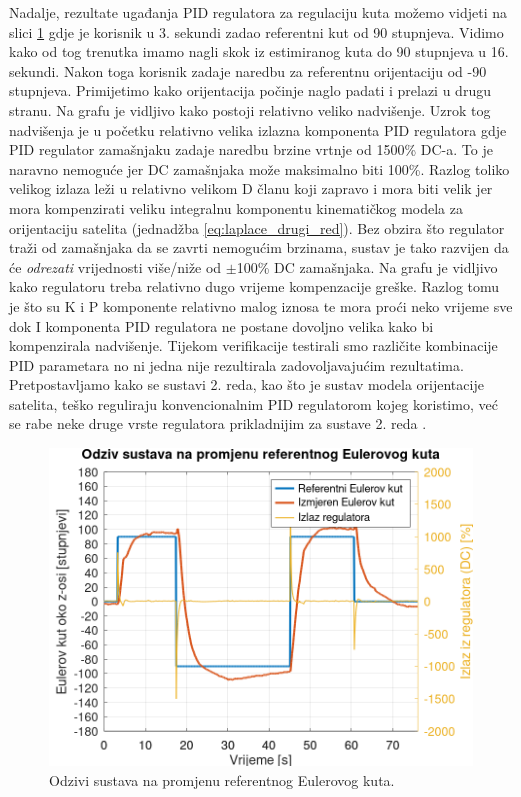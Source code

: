 \documentclass[times, utf8, diplomski, numeric]{templates/template}
\begin{document}
{{        Nadalje, rezultate ugađanja PID regulatora za regulaciju kuta možemo vidjeti na slici \ref{fig:angle_reg_user} gdje je korisnik u 3. sekundi zadao referentni kut od 90 stupnjeva. Vidimo kako od tog trenutka imamo nagli skok iz estimiranog kuta do 90 stupnjeva u 16. sekundi. Nakon toga korisnik zadaje naredbu za referentnu orijentaciju od -90 stupnjeva. Primijetimo kako orijentacija počinje naglo padati i prelazi u drugu stranu. Na grafu je vidljivo kako postoji relativno veliko nadvišenje. Uzrok tog nadvišenja je u početku relativno velika izlazna komponenta PID regulatora gdje PID regulator zamašnjaku zadaje naredbu brzine vrtnje od 1500\% DC-a. To je naravno nemoguće jer DC zamašnjaka može maksimalno biti 100\%. Razlog toliko velikog izlaza leži u relativno velikom D članu koji zapravo i mora biti velik jer mora kompenzirati veliku integralnu komponentu kinematičkog modela za orijentaciju satelita (jednadžba \ref{eq:laplace_drugi_red}). Bez obzira što regulator traži od zamašnjaka da se zavrti nemogućim brzinama, sustav je tako razvijen da će \emph{odrezati}  vrijednosti više/niže od $\pm$100\% DC zamašnjaka. Na grafu je vidljivo kako regulatoru treba relativno dugo vrijeme kompenzacije greške. Razlog tomu je što su K i P komponente relativno malog iznosa te mora proći neko vrijeme sve dok I komponenta PID regulatora ne postane dovoljno velika kako bi kompenzirala nadvišenje. Tijekom  verifikacije testirali smo različite kombinacije PID parametara no ni jedna nije rezultirala zadovoljavajućim rezultatima. Pretpostavljamo kako se sustavi 2. reda, kao što je sustav modela orijentacije satelita, teško reguliraju konvencionalnim PID regulatorom kojeg koristimo, već se rabe neke druge vrste regulatora prikladnijim za sustave 2. reda \cite{reg_2_red}. 

        \begin{figure}[htb]
        \centering
        \includegraphics[width=1.0\textwidth]{other/angle_reg_user.png}
        \caption{Odzivi sustava na promjenu referentnog Eulerovog kuta.}
        \label{fig:angle_reg_user}
        \end{figure}

}}
\end{document}

